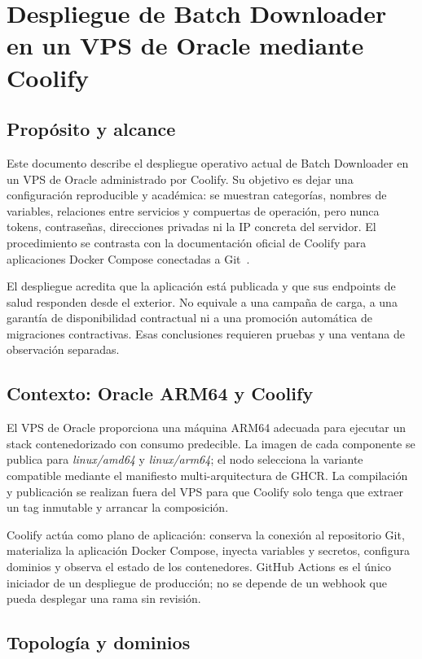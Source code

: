 \chapter{Despliegue de Batch Downloader en un VPS de Oracle mediante Coolify}

\section{Propósito y alcance}

Este documento describe el despliegue operativo actual de Batch Downloader en un VPS de Oracle administrado por Coolify. Su objetivo es dejar una configuración reproducible y académica: se muestran categorías, nombres de variables, relaciones entre servicios y compuertas de operación, pero nunca tokens, contraseñas, direcciones privadas ni la IP concreta del servidor. El procedimiento se contrasta con la documentación oficial de Coolify para aplicaciones Docker Compose conectadas a Git~\cite{coolifyDockerCompose}.

El despliegue acredita que la aplicación está publicada y que sus endpoints de salud responden desde el exterior. No equivale a una campaña de carga, a una garantía de disponibilidad contractual ni a una promoción automática de migraciones contractivas. Esas conclusiones requieren pruebas y una ventana de observación separadas.

\section{Contexto: Oracle ARM64 y Coolify}

El VPS de Oracle proporciona una máquina ARM64 adecuada para ejecutar un stack contenedorizado con consumo predecible. La imagen de cada componente se publica para \emph{linux/amd64} y \emph{linux/arm64}; el nodo selecciona la variante compatible mediante el manifiesto multi-arquitectura de GHCR. La compilación y publicación se realizan fuera del VPS para que Coolify solo tenga que extraer un tag inmutable y arrancar la composición.

Coolify actúa como plano de aplicación: conserva la conexión al repositorio Git, materializa la aplicación Docker Compose, inyecta variables y secretos, configura dominios y observa el estado de los contenedores. GitHub Actions es el único iniciador de un despliegue de producción; no se depende de un webhook que pueda desplegar una rama sin revisión.

\section{Topología y dominios}

